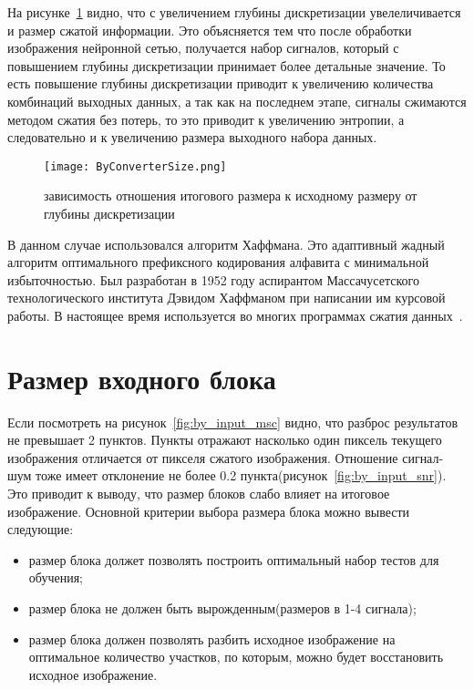 На рисунке~\ref{fig:by_converter_size} видно, что с увеличением глубины дискретизации увелеличивается и размер сжатой информации.
Это объясняется тем что после обработки изображения нейронной сетью, получается набор сигналов, который с повышением глубины дискретизации
принимает более детальные значение. То есть повышение глубины дискретизации приводит к увеличению количества комбинаций выходных данных,
а так как на последнем этапе, сигналы сжимаются методом сжатия без потерь, то это приводит к увеличению энтропии, а следовательно и к увеличению
размера выходного набора данных.

\begin{figure}[ht]
\centering
  \texttt{[image: ByConverterSize.png]}
  \caption{ зависимость отношения итогового размера к исходному размеру от глубины дискретизации }
  \label{fig:by_converter_size}
\end{figure}

В данном случае использовался алгоритм Хаффмана. Это адаптивный жадный алгоритм оптимального префиксного
кодирования алфавита с минимальной избыточностью. Был разработан в 1952 году аспирантом Массачусетского технологического
института Дэвидом Хаффманом при написании им курсовой работы. В настоящее время используется во многих программах сжатия данных~\cite{kormen}.

\section{Размер входного блока}
\label{sub:analysis:input}

Если посмотреть на рисунок~\ref{fig:by_input_msc} видно, что разброс результатов не превышает 2 пунктов. Пункты отражают насколько
один пиксель текущего изображения отличается от пикселя сжатого изображения. Отношение сигнал-шум тоже имеет отклонение не более 0.2 пункта(рисунок~\ref{fig:by_input_snr}).
Это приводит к выводу, что размер блоков слабо влияет на итоговое изображение. Основной критерии выбора размера блока можно вывести следующие:
\begin{itemize}
  \item размер блока должет позволять построить оптимальный набор тестов для обучения;
  \item размер блока не должен быть вырожденным(размеров в 1-4 сигнала);
  \item размер блока должен позволять разбить исходное изображение на оптимальное количество участков,
  по которым, можно будет восстановить исходное изображение.
\end{itemize}

